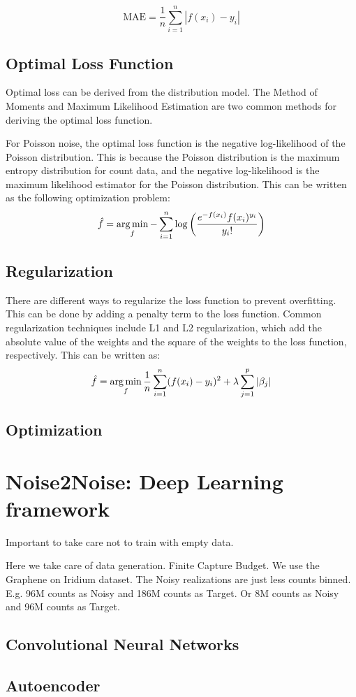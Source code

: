 \begin{equation}
    \text{MAE} = \frac{1}{n} \sum_{i=1}^{n} \left| f(x_i) - y_i \right|
\end{equation}

\subsection{Optimal Loss Function}
Optimal loss can be derived from the distribution model. The Method of Moments and Maximum Likelihood Estimation are two common methods for deriving the optimal loss function. 

For Poisson noise, the optimal loss function is the negative log-likelihood of the Poisson distribution. This is because the Poisson distribution is the maximum entropy distribution for count data, and the negative log-likelihood is the maximum likelihood estimator for the Poisson distribution.
This can be written as the following optimization problem:
\begin{equation}
    \hat{f} = \operatorname*{arg\,min}_f -\sum_{i=1}^{n} \log \left( \frac{e^{-f(x_i)} f(x_i)^{y_i}}{y_i!} \right)
\end{equation}


\subsection{Regularization}
There are different ways to regularize the loss function to prevent overfitting. This can be done by adding a penalty term to the loss function. Common regularization techniques include L1 and L2 regularization, which add the absolute value of the weights and the square of the weights to the loss function, respectively. This can be written as:
\begin{equation}
    \hat{f} = \operatorname*{arg\,min}_f \frac{1}{n} \sum_{i=1}^{n} (f(x_i) - y_i)^{2} + \lambda \sum_{j=1}^{p} \left| \beta_j \right|
\end{equation}

\subsection{Optimization}
\section{Noise2Noise: Deep Learning framework}
Important to take care not to train with empty data. 

Here we take care of data generation. Finite Capture Budget. We use the Graphene on Iridium dataset. The Noisy realizations are just less counts binned. 
E.g. 96M counts as Noisy and 186M counts as Target. Or 8M counts as Noisy and 96M counts as Target.
\subsection{Convolutional Neural Networks}
\subsection{Autoencoder}